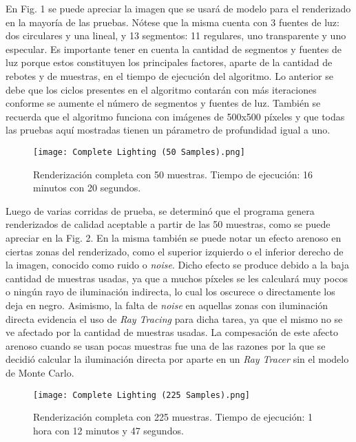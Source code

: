 \documentclass[conference]{IEEEtran}
\begin{document}
En Fig. 1 se puede apreciar la imagen que se usará de modelo para el renderizado en la mayoría de las pruebas. Nótese que la misma cuenta con 3 fuentes de luz: dos circulares y una lineal, y 13 segmentos: 11 regulares, uno transparente y uno especular. Es importante tener en cuenta la cantidad de segmentos y fuentes de luz porque estos constituyen los principales factores, aparte de la cantidad de rebotes y de muestras, en el tiempo de ejecución del algoritmo. Lo anterior se debe que los ciclos presentes en el algoritmo contarán con más iteraciones conforme se aumente el número de segmentos y fuentes de luz. También se recuerda que el algoritmo funciona con imágenes de 500x500 píxeles y que todas las pruebas aquí mostradas tienen un párametro de profundidad igual a uno.

\begin{figure}[htbp]
\centerline{\texttt{[image: Complete Lighting (50 Samples).png]}}
\caption{Renderización completa con 50 muestras. Tiempo de ejecución: 16 minutos con 20 segundos.}
\label{50 muestras completo}
\end{figure}

Luego de varias corridas de prueba, se determinó que el programa genera renderizados de calidad aceptable a partir de las 50 muestras, como se puede apreciar en la Fig. 2. En la misma también se puede notar un efecto arenoso en ciertas zonas del renderizado, como el superior izquierdo o el inferior derecho de la imagen, conocido como ruido o \textit{noise}. Dicho efecto se produce debido a la baja cantidad de muestras usadas, ya que a muchos píxeles se les calculará muy pocos o ningún rayo de iluminación indirecta, lo cual los oscurece o directamente los deja en negro. Asimismo, la falta de \textit{noise} en aquellas zonas con iluminación directa evidencia el uso de \textit{Ray Tracing} para dicha tarea, ya que el mismo no se ve afectado por la cantidad de muestras usadas. La compesación de este afecto arenoso cuando se usan pocas muestras fue una de las razones por la que se decidió calcular la iluminación directa por aparte en un \textit{Ray Tracer} sin el modelo de Monte Carlo.

\begin{figure}[htbp]
\centerline{\texttt{[image: Complete Lighting (225 Samples).png]}}
\caption{Renderización completa con 225 muestras. Tiempo de ejecución: 1 hora con 12 minutos y 47 segundos.}
\label{225 muestras completo}
\end{figure}
\end{document}
